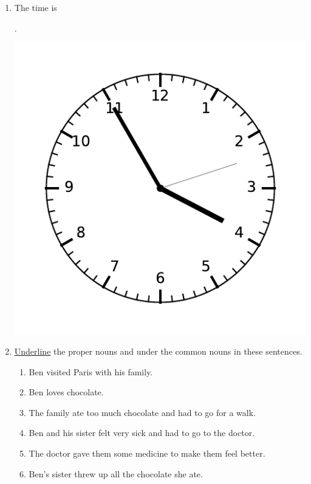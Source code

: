 \documentclass{tufte-book}
\begin{document}
\begin{enumerate}
  \item The time is \dotfill\bigskip\par\dotfill\bigskip.
  \begin{marginfigure}\includegraphics[width=\textwidth]{maths/fig/clock_0355.pdf}\end{marginfigure}

  \item \underline{Underline} the proper nouns and  under the common nouns in these sentences.
  \begin{enumerate}
    \item Ben visited Paris with his family.
    \item Ben loves chocolate.
    \item The family ate too much chocolate and had to go for a walk.
    \item Ben and his sister felt very sick and had to go to the doctor.
    \item The doctor gave them some medicine to make them feel better.
    \item Ben's sister threw up all the chocolate she ate.
  \end{enumerate}


\end{enumerate}
\end{document}
